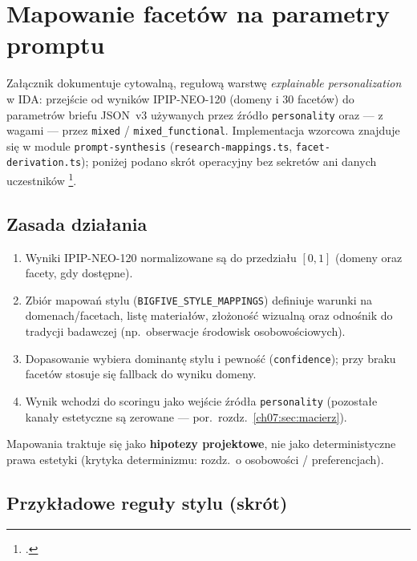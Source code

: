 \chapter{Mapowanie facetów na parametry promptu}
\label{app:c:top}

Załącznik dokumentuje cytowalną, regułową warstwę \emph{explainable personalization} w IDA: przejście od wyników IPIP-NEO-120 (domeny i 30 facetów) do parametrów briefu JSON~v3 używanych przez źródło \texttt{personality} oraz --- z wagami --- przez \texttt{mixed} / \texttt{mixed\_functional}. Implementacja wzorcowa znajduje się w module \texttt{prompt-synthesis} (\texttt{research-mappings.ts}, \texttt{facet-derivation.ts}); poniżej podano skrót operacyjny bez sekretów ani danych uczestników \footcite{idaPlatform2026}.

\section{Zasada działania}
\label{app:c:sec:zasada}

\begin{enumerate}
  \item Wyniki IPIP-NEO-120 normalizowane są do przedziału $[0,1]$ (domeny oraz facety, gdy dostępne).
  \item Zbiór mapowań stylu (\texttt{BIGFIVE\_STYLE\_MAPPINGS}) definiuje warunki na domenach/facetach, listę materiałów, złożoność wizualną oraz odnośnik do tradycji badawczej (np.\ obserwacje środowisk osobowościowych).
  \item Dopasowanie wybiera dominantę stylu i pewność (\texttt{confidence}); przy braku facetów stosuje się fallback do wyniku domeny.
  \item Wynik wchodzi do scoringu jako wejście źródła \texttt{personality} (pozostałe kanały estetyczne są zerowane --- por.\ rozdz.~\ref{ch07:sec:macierz}).
\end{enumerate}

Mapowania traktuje się jako \textbf{hipotezy projektowe}, nie jako deterministyczne prawa estetyki (krytyka determinizmu: rozdz.~o osobowości / preferencjach).

\section{Przykładowe reguły stylu (skrót)}
\label{app:c:sec:reguly}

